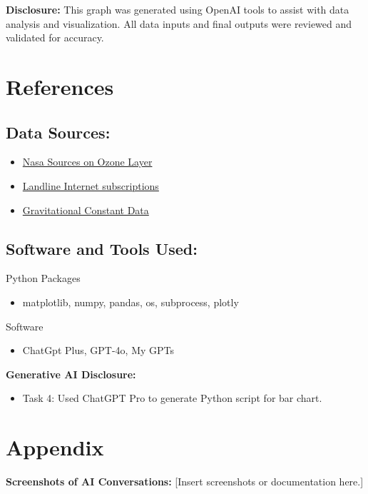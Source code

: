 \documentclass[a4paper,landscape]{article}
\begin{document}
\begin{figure}[H]
    \centering
    \caption{}
    \label{fig:inflation}
\end{figure}

\textbf{Disclosure:} This graph was generated using OpenAI tools to assist with data analysis and visualization. All data inputs and final outputs were reviewed and validated for accuracy.

\section{References}
\subsection{Data Sources:}
\begin{itemize}
    \item \href{https://ourworldindata.org/ozone-layer?insight=emissions-of-substances-that-deplete-the-ozone-layer-have-fallen-by-more-than-99#key-insights}{Nasa Sources on Ozone Layer}
    \item \href{https://ourworldindata.org/internet}{Landline Internet subscriptions}
    \item \href{https://en.wikipedia.org/wiki/Gravitational_constant}{Gravitational Constant Data}
\end{itemize}

\subsection{Software and Tools Used:}
Python Packages
\begin{itemize}
    \item matplotlib, numpy, pandas, os, subprocess, plotly
\end{itemize}
Software
\begin{itemize}
    \item ChatGpt Plus, GPT-4o, My GPTs
\end{itemize}
\textbf{Generative AI Disclosure:}
\begin{itemize}
    \item Task 4: Used ChatGPT Pro to generate Python script for bar chart.
\end{itemize}

\section{Appendix}
\textbf{Screenshots of AI Conversations:}
[Insert screenshots or documentation here.]
\end{document}
